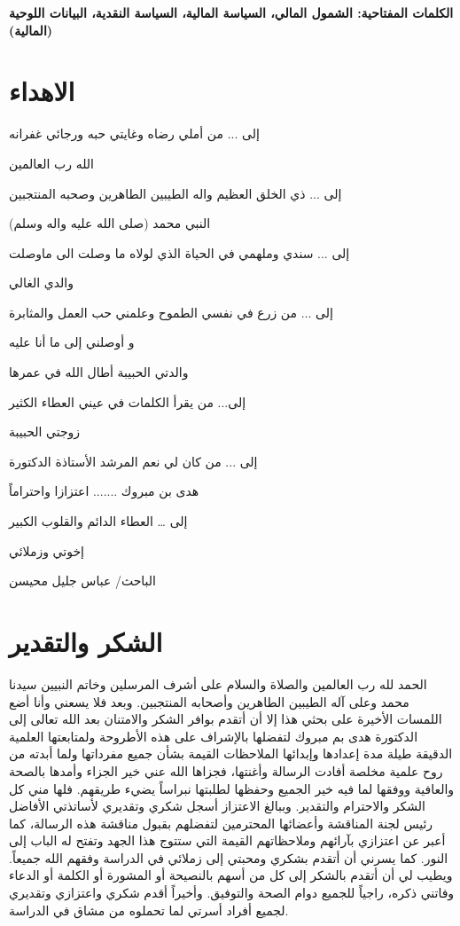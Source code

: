 \documentclass[10pt,a4paper]{report}
\newcommand{\myspace}{\hspace*{1cm}}
\begin{document}
\begin{doublespacing}
\noindent \textbf{الكلمات المفتاحية: الشمول المالي، السياسة المالية، السياسة النقدية، البيانات اللوحية (المالية)}

\newpage
\section*{\centering\ArefRuqaa الاهداء}
\begin{center}
	\Large\centering\ArefRuqaa
إلى ... من أملي رضاه وغايتي حبه ورجائي غفرانه

الله رب العالمين

إلى ... ذي الخلق العظيم واله الطيبين الطاهرين وصحبه المنتجبين

النبي محمد (صلى الله عليه واله وسلم)

إلى ... سندي وملهمي في الحياة الذي لولاه ما وصلت الى ماوصلت

والدي الغالي

إلى ... من زرع في نفسي الطموح وعلمني حب العمل والمثابرة

و أوصلني إلى ما أنا عليه

والدتي الحبيبة أطال الله في عمرها

إلى... من يقرأ الكلمات في عيني العطاء الكثير
 
زوجتي الحبيبة

إلى ... من كان لي نعم المرشد الأستاذة الدكتورة

هدى بن مبروك ....... اعتزازا واحتراماً

إلى … العطاء الدائم والقلوب الكبير

إخوتي وزملائي
\end{center}
\bigskip
\bigskip
\begin{flushleft}
	\ArefRuqaa
	\Large{الباحث/ }
	\Large{عباس جليل محيسن}
\end{flushleft}
\newpage
\section*{\centering الشكر والتقدير}
\myspace 
الحمد لله رب العالمين والصلاة والسلام على أشرف المرسلين وخاتم النبيين سيدنا محمد وعلى آله الطيبين الطاهرين وأصحابه المنتجبين.
وبعد فلا يسعني وأنا أضع اللمسات الأخيرة على بحثي هذا إلا أن أتقدم بوافر الشكر والامتنان بعد الله تعالى إلى الدكتورة هدى بم مبروك لتفضلها بالإشراف على هذه الأطروحة ولمتابعتها العلمية الدقيقة طيلة مدة إعدادها وإبدائها الملاحظات القيمة بشأن جميع مفرداتها ولما أبدته من روح علمية مخلصة أفادت الرسالة وأغنتها، فجزاها الله عني خير الجزاء وأمدها بالصحة والعافية ووفقها لما فيه خير الجميع وحفظها لطلبتها نبراساً يضيء طريقهم. فلها مني كل الشكر والاحترام والتقدير.
وببالغ الاعتزاز أسجل شكري وتقديري لأساتذتي الأفاضل رئيس لجنة المناقشة وأعضائها المحترمين لتفضلهم بقبول مناقشة هذه الرسالة، كما أعبر عن اعتزازي بآرائهم وملاحظاتهم القيمة التي ستتوج هذا الجهد وتفتح له الباب إلى النور.
كما يسرني أن أتقدم بشكري ومحبتي إلى زملائي في الدراسة وفقهم الله جميعاً.
ويطيب لي أن أتقدم بالشكر إلى كل من أسهم بالنصيحة أو المشورة أو الكلمة أو الدعاء وفاتني ذكره، راجياً للجميع دوام الصحة والتوفيق. وأخيراً أقدم شكري واعتزازي وتقديري لجميع أفراد أسرتي لما تحملوه من مشاق في الدراسة.


\end{doublespacing}
\end{document}
